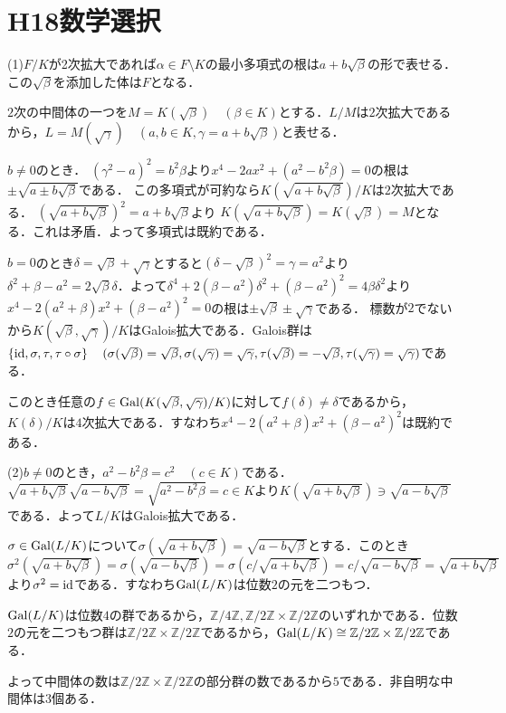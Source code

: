 \documentclass[
		book,
		head_space=20mm,
		foot_space=20mm,
		gutter=10mm,
		line_length=190mm
]{jlreq}
\begin{document}
\section{H18数学選択}
(1)$F/K$が2次拡大であれば$\alpha\in F\setminus K$の最小多項式の根は$a+b\sqrt{\beta}$の形で表せる．この$\sqrt{\beta}$を添加した体は$F$となる．

$2$次の中間体の一つを$M=K(\sqrt{\beta})\quad(\beta\in K)$とする．$L/M$は$2$次拡大であるから，$L=M(\sqrt{\gamma})\quad(a,b\in K,\gamma=a+b\sqrt{\beta})$と表せる．

$b\neq 0$のとき．
$(\gamma^2-a)^2=b^2\beta$より$x^4-2ax^2+(a^2-b^2\beta)=0$の根は
$\pm\sqrt{a\pm b\sqrt{\beta}}$である．
この多項式が可約なら$K(\sqrt{a+b\sqrt{\beta}})/K$は$2$次拡大である．
$(\sqrt{a+b\sqrt{\beta}})^2=a+b\sqrt{\beta}$より
$K(\sqrt{a+b\sqrt{\beta}})=K(\sqrt{\beta})=M$となる．これは矛盾．よって多項式は既約である．

$b=0$のとき$\delta=\sqrt{\beta}+\sqrt{\gamma}$とすると$(\delta-\sqrt{\beta})^2=\gamma=a^2$より
$\delta^2+\beta-a^2=2\sqrt{\beta}\delta$．よって$\delta^4+2(\beta-a^2)\delta^2+(\beta-a^2)^2=4\beta\delta^2$より$x^4-2(a^2+\beta)x^2+(\beta-a^2)^2=0$の根は$\pm \sqrt{\beta} \pm \sqrt{\gamma}$である．
標数が$2$でないから$K(\sqrt{\beta},\sqrt{\gamma})/K$はGalois拡大である．Galois群は$\left\{ \mathop{\mathrm{id}},\sigma,\tau,\tau \circ \sigma \right\}\quad (\sigma(\sqrt{\beta})=\sqrt{\beta},\sigma(\sqrt{\gamma})=\sqrt{\gamma},\tau(\sqrt{\beta})=-\sqrt{\beta},\tau(\sqrt{\gamma})=\sqrt{\gamma})$である．

このとき任意の$f \in \mathop{\mathrm{Gal}}(K(\sqrt{\beta},\sqrt{\gamma})/K)$に対して$f(\delta)\neq \delta$であるから，$K(\delta)/K$は$4$次拡大である．すなわち$x^4-2(a^2+\beta)x^2+(\beta-a^2)^2$は既約である．

(2)$b\neq 0$のとき，$a^2-b^2\beta=c^2\quad(c\in K)$である．$\sqrt{a+b\sqrt{\beta}}\sqrt{a-b\sqrt{\beta}}=\sqrt{a^2-b^2\beta}=c\in K$より$K(\sqrt{a+b\sqrt{\beta}})\ni \sqrt{a-b\sqrt{\beta}}$である．よって$L/K$はGalois拡大である．

$\sigma\in \mathop{\mathrm{Gal}}(L/K)$について$\sigma(\sqrt{a+b\sqrt{\beta}})=\sqrt{a-b\sqrt{\beta}}$とする．このとき$\sigma^2(\sqrt{a+b\sqrt{\beta}})=\sigma(\sqrt{a-b\sqrt{\beta}})=\sigma(c/\sqrt{a+b\sqrt{\beta}})=c/\sqrt{a-b\sqrt{\beta}}=\sqrt{a+b\sqrt{\beta}}$より$\sigma^2=\mathop{\mathrm{id}}$である．すなわち$\mathop{\mathrm{Gal}}(L/K)$は位数$2$の元を二つもつ．

$\mathop{\mathrm{Gal}}(L/K)$は位数$4$の群であるから，$\mathbb{Z}/4\mathbb{Z},\mathbb{Z}/2\mathbb{Z}\times \mathbb{Z}/2\mathbb{Z}$のいずれかである．位数$2$の元を二つもつ群は$\mathbb{Z}/2\mathbb{Z}\times \mathbb{Z}/2\mathbb{Z}$であるから，$\mathop{\mathrm{Gal}}(L/K)\cong \mathbb{Z}/2\mathbb{Z}\times \mathbb{Z}/2\mathbb{Z}$である．

よって中間体の数は$\mathbb{Z}/2\mathbb{Z}\times \mathbb{Z}/2\mathbb{Z}$の部分群の数であるから$5$である．非自明な中間体は$3$個ある．
\end{document}
